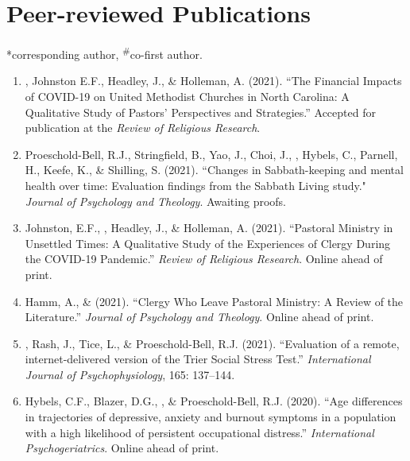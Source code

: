 \newcommand{\Revision}{\textit{under revision}}
\newcommand{\CS}{*} %
\newcommand{\CF}{\textsuperscript{\#}} %

\section*{Peer-reviewed Publications}
\CS corresponding author, \CF co-first author.

\begin{enumerate}
\item \Eagle, Johnston E.F., Headley, J., \& Holleman, A. (2021). ``The Financial Impacts of COVID-19 on United Methodist Churches in North Carolina: A Qualitative Study of Pastors’ Perspectives and Strategies.'' Accepted for publication at the \emph{Review of Religious Research}.

\item Proeschold-Bell, R.J., Stringfield, B., Yao, J., Choi, J., \Eagle, Hybels, C., Parnell, H., Keefe, K., \& Shilling, S. (2021). ``Changes in Sabbath-keeping and mental health over time: Evaluation findings from the Sabbath Living study." \textit{Journal of Psychology and Theology}. Awaiting proofs.
	
\item Johnston, E.F., \Eagle, Headley, J., \& Holleman, A. (2021). ``Pastoral Ministry in Unsettled Times: A Qualitative Study of the Experiences of Clergy During the COVID-19 Pandemic.'' \textit{Review of Religious Research}. Online ahead of print. 

\item Hamm, A., \&  \Eagle \hspace{.01em} (2021). ``Clergy Who Leave Pastoral Ministry: A Review of the Literature.'' \textit{Journal of Psychology and Theology}. Online ahead of print. 

\item \Eagle, Rash, J., Tice, L., \& Proeschold-Bell, R.J. (2021). ``Evaluation of a remote, internet-delivered version of the Trier Social Stress Test.'' \textit{International Journal of Psychophysiology}, 165: 137--144. 

\item Hybels, C.F., Blazer, D.G., \Eagle, \& Proeschold-Bell, R.J. (2020). ``Age differences in trajectories of depressive, anxiety and burnout symptoms in a population with a high likelihood of persistent occupational distress.'' \emph{International Psychogeriatrics}. Online ahead of print. 


\end{enumerate}
